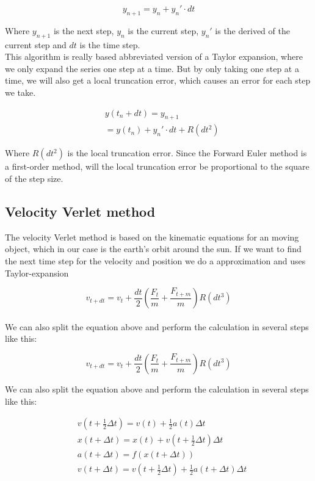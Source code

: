\documentclass{article}
\begin{document}
\begin{multicols}{2}
\begin{equation}
y_{n+1}=y_n + y_n'\cdot dt
\label{eq:yn1}
\end{equation}

Where $y_{n+1}$ is the next step, $y_n$ is the current step, $y_n'$ is the derived of the current step and $dt$ is the time step.\\
This algorithm is really based abbreviated version of a Taylor expansion, where we only expand the series one step at a time. But by only taking one step at a time, we will also get a local truncation error, which causes an error for each step we take. 

\begin{equation}
\begin{split}
&y(t_n+dt)=y_{n+1}\\
&=y(t_n)+y_n'\cdot dt + R(dt^2)
\end{split}
\label{eq:ytndt}
\end{equation} 

Where $R(dt^2)$ is the local truncation error. Since the Forward Euler method is a first-order method, will the local truncation error be proportional to the square of the step size. 

\subsection{Velocity Verlet method}

The velocity Verlet method is based on the kinematic equations for an moving object, which in our case is the earth's orbit around the sun. If we want to find the next time step for the velocity and position we do a approximation and uses Taylor-expansion   

\begin{equation}
    v_{t+dt}=v_t +\frac{dt}{2}(\frac{F_t}{m}+\frac{F_{t+m}}{m}) R(dt^3)
\end{equation}\\

We can also split the equation above and perform the calculation in several steps like this:

\begin{equation}
v_{t+dt}=v_t +\frac{dt}{2}(\frac{F_t}{m}+\frac{F_{t+m}}{m}) R(dt^3)
\label{eq:steps}
\end{equation}

We can also split the equation above and perform the calculation in several steps like this:

\begin{equation}
\begin{split}
&v(t+\frac{1}{2}\Delta t)=v(t)+\frac{1}{2}a(t)\Delta t\\
&x(t+\Delta t)=x(t)+v(t+\frac{1}{2}\Delta t)\Delta t\\
&a(t+\Delta t)=f(x(t+\Delta t))\\
&v(t+\Delta t)=v(t+\frac{1}{2}\Delta t)+\frac{1}{2}a(t+\Delta t)\Delta t
\end{split}
\label{eq:steps}
\end{equation}
\\
\\
\\



\end{multicols}
\end{document}
